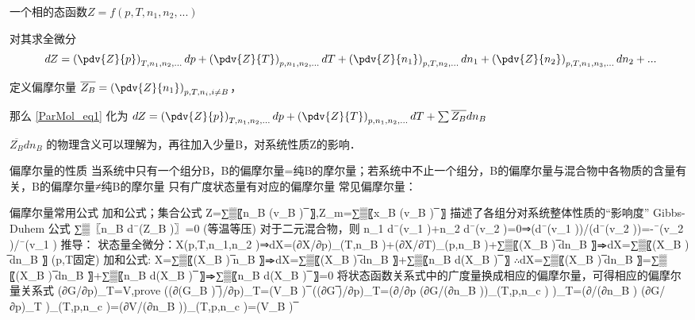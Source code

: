  
一个相的态函数$Z=f(p,T,n_1,n_2,...)$

对其求全微分  
\begin{equation}\label{ParMol_eq1}
dZ = \left(\pdv{Z}{p}\right)_{T,n_1,n_2,...}dp + \left(\pdv{Z}{T}\right)_{p,n_1,n_2,...}dT+\left(\pdv{Z}{n_1}\right)_{p,T,n_2,...}dn_1+\left(\pdv{Z}{n_2}\right)_{p,T,n_1,n_3,...}dn_2+...
\end{equation}

定义偏摩尔量 $\overline {Z_B} = \left(\pdv{Z}{n_1}\right)_{p,T,n_i, i \neq B} $，

那么 \autoref{ParMol_eq1} 化为 $dZ = \left(\pdv{Z}{p}\right)_{T,n_1,n_2,...}dp + \left(\pdv{Z}{T}\right)_{p,n_1,n_2,...}dT+\sum \overline {Z_B} dn_B$

$\overline {Z_B} d n_B$ 的物理含义可以理解为，再往加入少量B，对系统性质Z的影响．

偏摩尔量的性质
	当系统中只有一个组分B，B的偏摩尔量=纯B的摩尔量；若系统中不止一个组分，B的偏摩尔量与混合物中各物质的含量有关，B的偏摩尔量≠纯B的摩尔量
	只有广度状态量有对应的偏摩尔量
	常见偏摩尔量：
	 

偏摩尔量常用公式
	加和公式；集合公式
	Z=∑▒〖n_B (v_B ) ̅ 〗,Z_m=∑▒〖x_B (v_B ) ̅ 〗
	描述了各组分对系统整体性质的“影响度”
	Gibbs-Duhem 公式
	∑▒〖n_B d¯(Z_B )〗=0 (等温等压)
	对于二元混合物，则 n_1 d¯(v_1 )+n_2 d¯(v_2 )=0⇒(d¯(v_1 ))/(d¯(v_2 ))=-¯(v_2 )/¯(v_1 )
	推导：
	状态量全微分：X(p,T,n_1,n_2 )⇒dX=(∂X/∂p)_(T,n_B )+(∂X/∂T)_(p,n_B )+∑▒〖(X_B ) ̅dn_B 〗⇒dX=∑▒〖(X_B ) ̅dn_B 〗  (p,T固定)
	加和公式: X=∑▒〖(X_B ) ̅n_B 〗⇒dX=∑▒〖(X_B ) ̅dn_B 〗+∑▒〖n_B d(X_B ) ̅ 〗
	∴dX=∑▒〖(X_B ) ̅dn_B 〗=∑▒〖(X_B ) ̅dn_B 〗+∑▒〖n_B d(X_B ) ̅ 〗⇒∑▒〖n_B d(X_B ) ̅ 〗=0
	将状态函数关系式中的广度量换成相应的偏摩尔量，可得相应的偏摩尔量关系式
	(∂G/∂p)_T=V,prove ((∂(G_B ) ̅)/∂p)_T=(V_B ) ̅
	((∂G ̅)/∂p)_T=(∂/∂p (∂G/(∂n_B ))_(T,p,n_c ) )_T=(∂/(∂n_B ) (∂G/∂p)_T )_(T,p,n_c )=(∂V/(∂n_B ))_(T,p,n_c )=(V_B ) ̅
